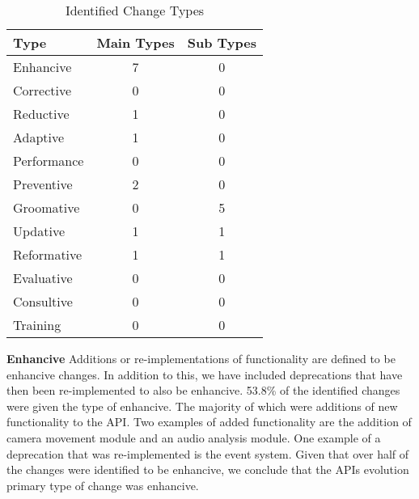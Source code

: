 \documentclass{sig-alternate}
\begin{document}
\begin{table}
       \centering
       \begin{tabular}[ht]{l|c|c}
              \toprule

              \textbf{Type}                              & \textbf{Main Types}   &\textbf{Sub Types} \\ \midrule
              Enhancive     & 7 & 0                     \\ \hline
              Corrective    & 0 & 0                     \\ \hline
              Reductive     & 1 & 0                    \\ \hline
              Adaptive      & 1 & 0                     \\ \hline
              Performance   & 0 & 0                    \\ \hline
              Preventive    & 2 & 0                     \\ \hline
              Groomative    & 0 & 5                     \\ \hline
              Updative      & 1 & 1                    \\ \hline
              Reformative   & 1 & 1                     \\ \hline
              Evaluative    & 0 & 0                    \\ \hline
              Consultive    & 0 & 0                    \\ \hline
              Training      & 0 & 0                    \\ 

              \bottomrule

       \end{tabular}
       \caption{Identified Change Types}
       \label{table:type_counts}
\end{table}

\smallskip \noindent
\textbf{Enhancive  }
Additions or re-implementations of functionality are defined to be enhancive changes. In addition to this, we have included deprecations that have then been re-implemented to also be enhancive.
53.8\% of the identified changes were given the type of enhancive. The majority of which were additions of new functionality to the API. Two examples of added functionality are the addition of camera movement module and an audio analysis module. One example of a deprecation that was re-implemented is the event system.
Given that over half of the changes were identified to be enhancive, we conclude that the APIs evolution primary type of change was enhancive. 
\end{document}
